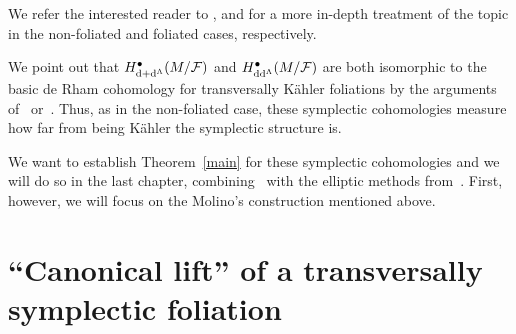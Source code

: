 \documentclass[pdftex]{sigma}
\numberwithin{equation}{section}
\begin{document}
We refer the interested reader to \cite{tseng,yan}, and \cite{baczekija,pawelija} for a more in-depth treatment of the topic in the non-foliated and foliated cases, respectively.

We point out that $H^{\bullet}_{{\rm d}+{\rm d}^{\Lambda}}(M\slash\mathcal{F})$ and $H^{\bullet}_{{\rm d}{\rm d}^{\Lambda}}(M\slash\mathcal{F})$ are both isomorphic to the basic de Rham cohomology for transversally K\"ahler foliations by the arguments of~\cite{pawel} or~\cite{baczekija}. Thus, as in the non-foliated case, these symplectic cohomologies measure how far from being K\"ahler the symplectic structure is.

We want to establish Theorem~\ref{main} for these symplectic cohomologies and we will do so in the last chapter, combining~\cite{tseng} with the elliptic methods from~\cite{azizeliptyczny}. First, however, we will focus on the Molino's construction mentioned above.

\section{``Canonical lift'' of a transversally symplectic foliation} \label{bundle}
\end{document}
